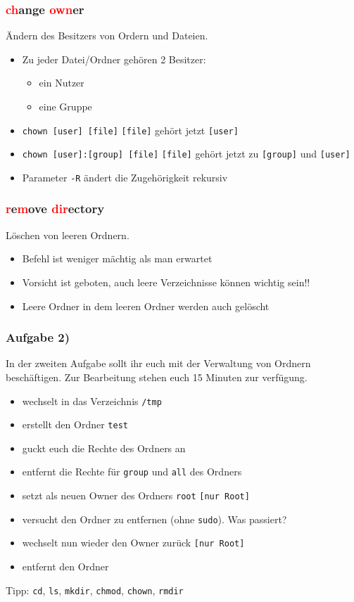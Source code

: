 \documentclass[12pt,utf8, handout]{beamer}
\begin{document}
\begin{frame}
\frametitle{\textcolor{red}{ch}ange \textcolor{red}{own}er}
Ändern des Besitzers von Ordern und Dateien.
\begin{itemize}
	\item Zu jeder Datei/Ordner gehören 2 Besitzer:
	\begin{itemize}[<+->]
		\item ein Nutzer
		\item eine Gruppe
	\end{itemize}
	\item \texttt{chown [user] [file]} \texttt{[file]} gehört jetzt \texttt{[user]}
	\item \texttt{chown [user]:[group] [file]} \texttt{[file]} gehört jetzt zu \texttt{[group]} und \texttt{[user]}
	\item Parameter \texttt{-R} ändert die Zugehörigkeit rekursiv
\end{itemize}
\end{frame}

\begin{frame}
\frametitle{\textcolor{red}{r}e\textcolor{red}{m}ove \textcolor{red}{dir}ectory}
Löschen von leeren Ordnern.
\begin{itemize}
	\item Befehl ist weniger mächtig als man erwartet
	\item Vorsicht ist geboten, auch leere Verzeichnisse können wichtig sein!!
	\item Leere Ordner in dem leeren Ordner werden auch gelöscht
\end{itemize}
\end{frame}

\begin{frame}
\frametitle{Aufgabe 2)}
In der zweiten Aufgabe sollt ihr euch mit der Verwaltung von Ordnern beschäftigen. Zur Bearbeitung stehen euch 15 Minuten zur verfügung.
{\footnotesize
\begin{itemize}
	\item wechselt in das Verzeichnis \texttt{/tmp}
	\item erstellt den Ordner \texttt{test}
	\item guckt euch die Rechte des Ordners an
	\item entfernt die Rechte für \texttt{group} und \texttt{all} des Ordners
	\item setzt als neuen Owner des Ordners \texttt{root} \texttt{[nur Root]}
	\item versucht den Ordner zu entfernen (ohne \texttt{sudo}). Was passiert?
	\item wechselt nun wieder den Owner zurück \texttt{[nur Root]}
	\item entfernt den Ordner
\end{itemize}
}
{\scriptsize Tipp: \texttt{cd}, \texttt{ls}, \texttt{mkdir}, \texttt{chmod}, \texttt{chown}, \texttt{rmdir}}
\end{frame}
\end{document}
